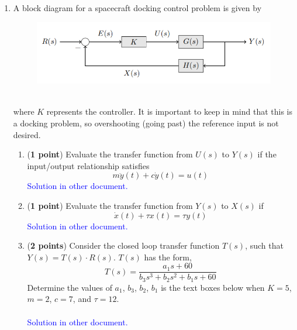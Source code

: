 \documentclass[]{article}
\begin{document}
\begin{enumerate}

    \item A block diagram for a spacecraft docking control problem is given by
    \begin{figure}[h]
        \includegraphics[scale=0.8,center]{AERO_422_HW3_P1.png}
    \end{figure}
    \\where $K$ represents the controller. It is important to keep in mind that this is a docking problem, so overshooting (going past) the reference input is not desired.

    \begin{enumerate}
        \item (\textbf{1 point}) Evaluate the transfer function from $U(s)$ to $Y(s)$ if the input/output relationship satisfies
        $$m\ddot{y}(t) + c\dot{y}(t) = u(t)$$
        \textcolor{blue}{
        Solution in other document.
        }

        \item (\textbf{1 point}) Evaluate the transfer function from $Y(s)$ to $X(s)$ if
        $$\dot{x}(t) + \tau x(t) = \tau y(t)$$
        \textcolor{blue}{
        Solution in other document.
        }

        \item (\textbf{2 points}) Consider the closed loop transfer function $T(s)$, such that $Y(s) = T(s) \cdot R(s)$. $T(s)$ has the form, 
        $$T(s) = \frac{a_1s + 60}{b_3s^3 + b_2s^2 + b_1s + 60}$$        
        Determine the values of $a_1$, $b_3$, $b_2$, $b_1$ is the text boxes below when
        $K = 5$, $m = 2$, $c = 7$, and $\tau = 12$.\\\\
        \textcolor{blue}{
        Solution in other document.
        }


\end{enumerate}
\end{enumerate}
\end{document}
